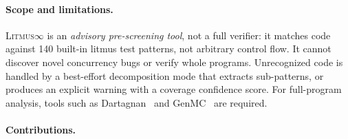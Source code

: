 \documentclass[11pt]{article}
\newcommand{\litmus}{\textsc{Litmus$\infty$}}
\begin{document}
\paragraph{Scope and limitations.}
\litmus{} is an \emph{advisory pre-screening tool}, not a full
verifier: it matches code against 140 built-in litmus test patterns,
not arbitrary control flow.
It cannot discover novel concurrency bugs or verify whole programs.
Unrecognized code is handled by a best-effort decomposition mode
that extracts sub-patterns, or produces an explicit warning with a
coverage confidence score. For full-program analysis, tools such as
Dartagnan~\cite{Gavrilenko2019} and GenMC~\cite{Kokologiannakis2019}
are required.

\paragraph{Contributions.}
\end{document}
